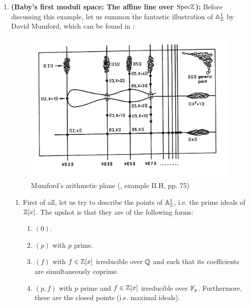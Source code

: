                 \begin{example}
                    \noindent
                    \begin{enumerate}
                        \item \textbf{(Baby's first moduli space: The affine line over $\mathrm{Spec} \mathbb{Z}$):} Before discussing this example, let us summon the fantastic illustration of $\mathbb{A}^1_{\mathbb{Z}}$ by David Mumford, which can be found in \cite{redbook}:
                            \begin{figure}[H]
                                \centering
                                \includegraphics[width=\linewidth,height=\textheight,keepaspectratio]{Figures/Spec Z[x].png}
                                \caption{Mumford's arithmetic plane (\cite{redbook}, example II.H, pp. 75)}
                                \label{fig: integer_affine_line}
                            \end{figure}
                            \noindent
                            \begin{enumerate}
                                \item First of all, let us try to describe the points of $\mathbb{A}^1_{\mathbb{Z}}$, i.e. the prime ideals of $\mathbb{Z}[x]$. The upshot is that they are of the following forms:
                                    \begin{enumerate}
                                        \item $(0)$.
                                        \item $(p)$ with $p$ prime.
                                        \item $(f)$ with $f \in \mathbb{Z}[x]$ irreducible over $\mathbb{Q}$ and such that its coefficients are simultaneously coprime.
                                        \item $(p, f)$ with $p$ prime and $f \in \mathbb{Z}[x]$ irreducible over $\mathbb{F}_p$. Furthermore, these are the closed points (i.e. maximal ideals).
                                    \end{enumerate}
                                

\end{enumerate}
\end{enumerate}
\end{example}

